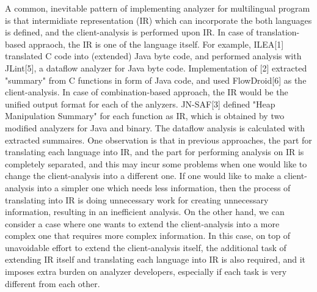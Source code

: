 A common, inevitable pattern of implementing analyzer for multilingual program
is that intermidiate representation (IR) which can incorporate the both
languages is defined, and the client-analysis is performed upon IR. In case of
translation-based appraoch, the IR is one of the language itself. For example, ILEA[1]
translated C code into (extended) Java byte code, and performed analysis with
JLint[5], a dataflow analyzer for Java byte code. Implementation of [2] extracted
"summary" from C functions in form of Java code, and used FlowDroid[6] as the
client-analysis. In case of combination-based approach, the IR would be the unified
output format for each of the anlyzers. JN-SAF[3] defined "Heap Manipulation Summary"
for each function as IR, which is obtained by two modified analyzers for Java
and binary. The dataflow analysis is calculated with extracted summaires.  One
observation is that in previous approaches, the part for translating each
language into IR, and the part for performing analysis on IR is completely
separated, and this may incur some problems when one would like to change the
client-analysis into a different one. If one would like to make a
client-analysis into a simpler one which needs less information, then the
process of translating into IR is doing unnecessary work for creating
unnecessary information, resulting in an inefficient analysis. On the other
hand, we can consider a case where one wants to extend the client-analysis into
a more complex one that requires more complex information. In this case, on top
of unavoidable effort to extend the client-analysis itself, the additional task
of extending IR itself and translating each language into IR is also required,
and it imposes extra burden on analyzer developers, especially if each task is
very different from each other.

